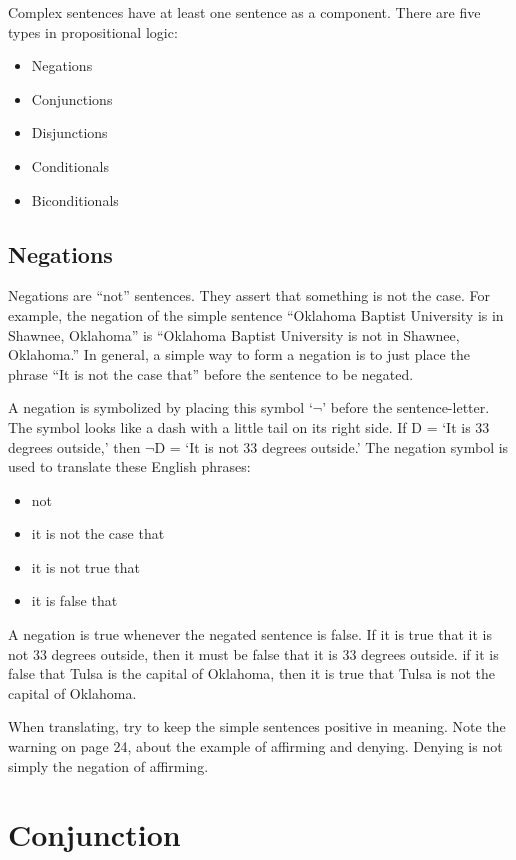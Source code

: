 Complex sentences have at least one sentence as a component. There are five types in propositional logic:

\begin{itemize}
\item
  Negations
\item
  Conjunctions
\item
  Disjunctions
\item
  Conditionals
\item
  Biconditionals
\end{itemize}

\subsection{Negations}\label{negations}

Negations are ``not'' sentences. They assert that something is not the case. For example, the negation of the simple sentence ``Oklahoma Baptist University is in Shawnee, Oklahoma'' is ``Oklahoma Baptist University is not in Shawnee, Oklahoma.'' In general, a simple way to form a negation is to just place the phrase ``It is not the case that'' before the sentence to be negated.

A negation is symbolized by placing this symbol `\(\neg\)' before the sentence-letter. The symbol looks like a dash with a little tail on its right side. If \(\textrm{D}\) = `It is 33 degrees outside,' then \(\neg \textrm{D}\) = `It is not 33 degrees outside.' The negation symbol is used to translate these English phrases:

\begin{itemize}
\item
  not
\item
  it is not the case that
\item
  it is not true that
\item
  it is false that
\end{itemize}

A negation is true whenever the negated sentence is false. If it is true that it is not 33 degrees outside, then it must be false that it is 33 degrees outside. if it is false that Tulsa is the capital of Oklahoma, then it is true that Tulsa is not the capital of Oklahoma.

When translating, try to keep the simple sentences positive in meaning. Note the warning on page 24, about the example of affirming and denying. Denying is not simply the negation of affirming.

\section{Conjunction}\label{conjunction}

